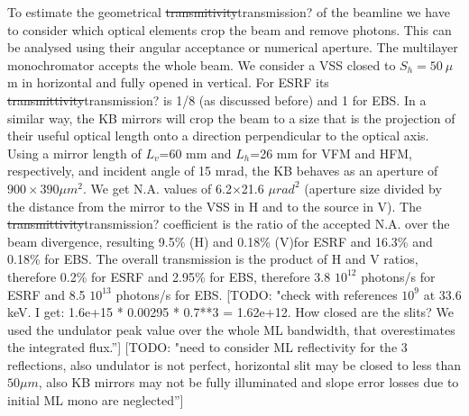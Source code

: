 \documentclass{iucr}              %
\newcommand{\todo}[1]{{\color{red}[TODO: "#1'']}}
\begin{document}
To estimate the geometrical {\color{red}\sout{transmitivity}transmission?} of the beamline we have to consider which optical elements crop the beam and remove photons. This can be analysed using their angular acceptance or numerical aperture. The multilayer monochromator accepts the whole beam. We consider a VSS closed to $S_h=50~\mu$m in horizontal and fully opened in vertical. For ESRF its {\color{red}\sout{transmittivity}transmission?} is 1/8 (as discussed before) and 1 for EBS. In a similar way, the KB mirrors will crop the beam to a size that is the projection of their {\color{red}useful optical} length onto a direction perpendicular to the optical axis. Using a mirror length of $L_v$=60 mm and $L_h$=26 mm for VFM and HFM, respectively, and incident angle of 15 mrad, the KB behaves as an aperture of $900 \times 390 \mu m^2$. We get N.A. values of 6.2$\times$21.6 $\mu rad^2$ (aperture size divided by the distance from the mirror to the VSS in H and to the source in V). The {\color{red}\sout{transmittivity}transmission?} coefficient is the ratio of the accepted N.A. over the beam divergence, resulting 9.5\% (H) and 0.18\% (V)for ESRF and 16.3\% and 0.18\% for EBS. The overall transmission is the product of H and V ratios, therefore 0.2\% for ESRF and 2.95\% for EBS, therefore 3.8 $10^{12}$ photons/s for ESRF and 8.5 $10^{13}$ photons/s for EBS. 
\todo{check with references $10^9$ at 33.6 keV. I get: 1.6e+15 * 0.00295 * 0.7**3 = 1.62e+12. How closed are the slits? We used the undulator peak value over the whole ML bandwidth, that overestimates the integrated flux.}
\todo{need to consider ML reflectivity for the 3 reflections, also undulator is not perfect, horizontal slit may be closed to less than $50 \mu m$, also KB mirrors may not be fully illuminated and slope error losses due to initial ML mono are neglected}
\end{document}
